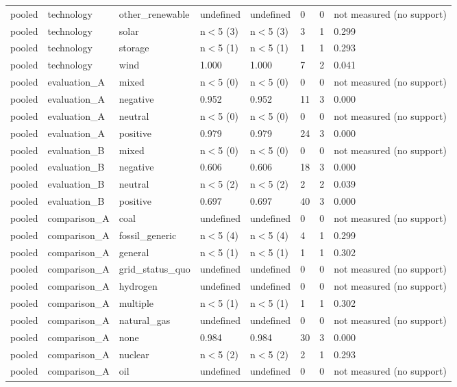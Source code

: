 \begin{table}[htbp]
\begin{tabular}{llllllll}
pooled & technology & other\_renewable & undefined & undefined & 0 & 0 & not measured (no support) \\
pooled & technology & solar & n$<$5 (3) & n$<$5 (3) & 3 & 1 & 0.299 \\
pooled & technology & storage & n$<$5 (1) & n$<$5 (1) & 1 & 1 & 0.293 \\
pooled & technology & wind & 1.000 & 1.000 & 7 & 2 & 0.041 \\
pooled & evaluation\_A & mixed & n$<$5 (0) & n$<$5 (0) & 0 & 0 & not measured (no support) \\
pooled & evaluation\_A & negative & 0.952 & 0.952 & 11 & 3 & 0.000 \\
pooled & evaluation\_A & neutral & n$<$5 (0) & n$<$5 (0) & 0 & 0 & not measured (no support) \\
pooled & evaluation\_A & positive & 0.979 & 0.979 & 24 & 3 & 0.000 \\
pooled & evaluation\_B & mixed & n$<$5 (0) & n$<$5 (0) & 0 & 0 & not measured (no support) \\
pooled & evaluation\_B & negative & 0.606 & 0.606 & 18 & 3 & 0.000 \\
pooled & evaluation\_B & neutral & n$<$5 (2) & n$<$5 (2) & 2 & 2 & 0.039 \\
pooled & evaluation\_B & positive & 0.697 & 0.697 & 40 & 3 & 0.000 \\
pooled & comparison\_A & coal & undefined & undefined & 0 & 0 & not measured (no support) \\
pooled & comparison\_A & fossil\_generic & n$<$5 (4) & n$<$5 (4) & 4 & 1 & 0.299 \\
pooled & comparison\_A & general & n$<$5 (1) & n$<$5 (1) & 1 & 1 & 0.302 \\
pooled & comparison\_A & grid\_status\_quo & undefined & undefined & 0 & 0 & not measured (no support) \\
pooled & comparison\_A & hydrogen & undefined & undefined & 0 & 0 & not measured (no support) \\
pooled & comparison\_A & multiple & n$<$5 (1) & n$<$5 (1) & 1 & 1 & 0.302 \\
pooled & comparison\_A & natural\_gas & undefined & undefined & 0 & 0 & not measured (no support) \\
pooled & comparison\_A & none & 0.984 & 0.984 & 30 & 3 & 0.000 \\
pooled & comparison\_A & nuclear & n$<$5 (2) & n$<$5 (2) & 2 & 1 & 0.293 \\
pooled & comparison\_A & oil & undefined & undefined & 0 & 0 & not measured (no support) \\

\end{tabular}
\end{table}
